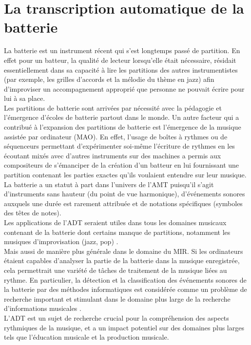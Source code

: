 \section{La transcription automatique de la batterie}
La batterie est un instrument récent qui s’est longtemps passé de partition. En effet pour un batteur, la qualité de lecteur lorsqu’elle était nécessaire, résidait essentiellement dans sa capacité à lire les partitions des autres instrumentistes (par exemple, les grilles d’accords et la mélodie du thème en jazz) afin d’improviser un accompagnement approprié que personne ne pouvait écrire pour lui à sa place.\\
Les partitions de batterie sont arrivées par nécessité avec la pédagogie et l’émergence d’écoles de batterie partout dans le monde. Un autre facteur qui a contribué à l’expansion des partitions de batterie est l’émergence de la musique assistée par ordinateur (MAO). En effet, l’usage de boîtes à rythmes ou de séquenceurs permettant d’expérimenter soi-même l’écriture de rythmes en les écoutant mixés avec d’autres instruments sur des machines a permis  aux compositeurs de s’émanciper de la création d’un batteur en lui fournissant une partition contenant les parties exactes qu’ils voulaient entendre sur leur musique.\\
La batterie a un statut à part dans l’univers de l’AMT puisqu'il s'agit d'instruments sans hauteur (du point de vue harmonique), d'événements sonores auxquels une durée est rarement attribuée et de notations spécifiques (symboles des têtes de notes).\\
Les applications de l’ADT seraient utiles dans tous les domaines musicaux contenant de la batterie dont certains manque de partitions, notamment les musiques d’improvisation (jazz, pop) \cite{future_directions}.\\
Mais aussi de manière plus générale dans le domaine du MIR. Si les ordinateurs étaient capables d'analyser la partie de la batterie dans la musique enregistrée, cela permettrait une variété de tâches de traitement de la musique liées au rythme. En particulier, la détection et la classification des événements sonores de la batterie par des méthodes informatiques est considérée comme un problème de recherche important et stimulant dans le domaine plus large de la recherche d'informations musicales \cite{Review_ADT}.\\
L'ADT est un sujet de recherche crucial pour la compréhension des aspects rythmiques de la musique, et a un impact potentiel sur des domaines plus larges tels que l'éducation musicale et la production musicale.
